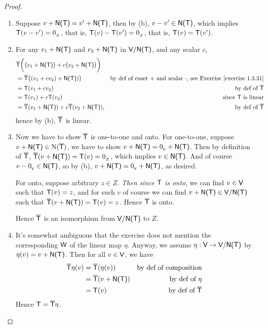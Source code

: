 \begin{proof} \ 

\begin{enumerate}
\item Suppose \(v + \textsf{N(T)} = v' + \textsf{N(T)}\), then by (b), \(v - v' \in \textsf{N(T)}\), which implies \(\textsf{T}(v - v') = 0_{_Z}\), that is, \(\textsf{T}(v) - \textsf{T}(v') = 0_{_Z}\), that is, \(\textsf{T}(v) = \textsf{T}(v')\).

\item For any \(v_1 + \textsf{N(T)}\) and \(v_2 + \textsf{N(T)}\) in \(\textsf{V}/\textsf{N(T)}\), and any scalar \(c\),
\begin{align*}
    & \overline{\T}\bigg( \big( v_1 + \NULLT \big) + c \big(v_2 + \NULLT \big)  \bigg) \\
    & = \overline{\T}\big( (v_1 + cv_2) + \NULLT) \big) & \text{by def of coset \(+\) and scalar \(\cdot\), see \EXEC{1.3.31}} \\
    & = \T(v_1 + cv_2) & \text{by def of \(\overline{\T}\)} \\
    & = \T(v_1) + c\T(v_2) & \text{since \(\T\) is linear} \\
    & = \overline{\T}(v_1 + \NULLT) + c\overline{\T}(v_2 + \NULLT), & \text{by def of \(\overline{\T}\)}
\end{align*}
hence by (b), \(\overline{\textsf{T}}\) is linear.

\item Now we have to show \(\overline{\textsf{T}}\) is one-to-one and onto.
For one-to-one, suppose \(v + \textsf{N(T)} \in \mathrm{N}(\overline{\textsf{T}})\), we have to show \(v + \textsf{N(T)} = 0_{_{\textsf{V}}} + \textsf{N(T)}\).
Then by definition of \(\overline{\textsf{T}}\), \(\overline{\textsf{T}}(v + \textsf{N(T)}) = \textsf{T}(v) = 0_{_Z}\), which implies \(v \in \textsf{N(T)}\).
And of course \(v - 0_{_{\textsf{V}}} \in \textsf{N(T)}\), so by (b), \(v + \textsf{N(T)} = 0_{_{\textsf{V}}} + \textsf{N(T)}\), as desired.

For onto, suppose arbitrary \(z \in Z\).
\emph{Then since \(\textsf{T}\) is onto}, we can find \(v \in \textsf{V}\) such that \(\textsf{T}(v) = z\), and for such \(v\) of course we can find \(v + \textsf{N(T)} \in \textsf{V}/\textsf{N(T)}\) such that \(\overline{\textsf{T}}(v + \textsf{N(T)}) = \textsf{T}(v) = z\).
Hence \(\overline{\textsf{T}}\) is onto.

Hence \(\overline{\textsf{T}}\) is an isomorphism from \(\textsf{V}/\textsf{N(T)}\) to \(Z\).

\item It's somewhat ambiguous that the exercise does not mention the corresponding \(\textsf{W}\) of the linear map \(\eta\).
Anyway, we assume \(\eta : \textsf{V} \to \textsf{V}/\textsf{N(T)}\) by \(\eta(v) = v + \textsf{N(T)}\).
Then for all \(v \in \textsf{V}\), we have
\begin{align*}
    \overline{\textsf{T}}\eta(v) & = \overline{\textsf{T}}(\eta(v)) & \text{by def of composition} \\
                         & = \overline{\textsf{T}}(v + \textsf{N(T)}) & \text{by def of \(\eta\)} \\
                         & = \textsf{T}(v) & \text{by def of \(\overline{\textsf{T}}\)}
\end{align*}
Hence \(\textsf{T} = \overline{\textsf{T}}\eta\).
\end{enumerate}
\end{proof}

